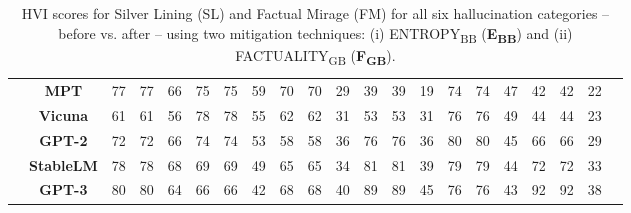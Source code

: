 \begin{table}[H]
{\begin{tabular}{lcccccccccccccccccccc}
&\textbf{MPT} &\cellcolor[HTML]{E6EEF7}77 &\cellcolor[HTML]{E6EEF7}77 &\cellcolor[HTML]{E6EEF7}66 &\cellcolor[HTML]{E6EEF7}75 &\cellcolor[HTML]{E6EEF7}75 &\cellcolor[HTML]{E6EEF7}59 &\cellcolor[HTML]{E6EEF7}70 &\cellcolor[HTML]{E6EEF7}70 &\cellcolor[HTML]{E6EEF7}29 &\cellcolor[HTML]{E6EEF7}39 &\cellcolor[HTML]{E6EEF7}39 &\cellcolor[HTML]{E6EEF7}19 &\cellcolor[HTML]{E6EEF7}74 &\cellcolor[HTML]{E6EEF7}74 &\cellcolor[HTML]{E6EEF7}47 &\cellcolor[HTML]{E6EEF7}42 &\cellcolor[HTML]{E6EEF7}42 &\cellcolor[HTML]{E6EEF7}22 \\
&\textbf{Vicuna} &\cellcolor[HTML]{E6EEF7}61 &\cellcolor[HTML]{E6EEF7}61 &\cellcolor[HTML]{E6EEF7}56 &\cellcolor[HTML]{E6EEF7}78 &\cellcolor[HTML]{E6EEF7}78 &\cellcolor[HTML]{E6EEF7}55 &\cellcolor[HTML]{E6EEF7}62 &\cellcolor[HTML]{E6EEF7}62 &\cellcolor[HTML]{E6EEF7}31 &\cellcolor[HTML]{E6EEF7}53 &\cellcolor[HTML]{E6EEF7}53 &\cellcolor[HTML]{E6EEF7}31 &\cellcolor[HTML]{E6EEF7}76 &\cellcolor[HTML]{E6EEF7}76 &\cellcolor[HTML]{E6EEF7}49 &\cellcolor[HTML]{E6EEF7}44 &\cellcolor[HTML]{E6EEF7}44 &\cellcolor[HTML]{E6EEF7}23 \\
&\textbf{GPT-2} &\cellcolor[HTML]{E6EEF7}72 &\cellcolor[HTML]{E6EEF7}72 &\cellcolor[HTML]{E6EEF7}66 &\cellcolor[HTML]{E6EEF7}74 &\cellcolor[HTML]{E6EEF7}74 &\cellcolor[HTML]{E6EEF7}53 &\cellcolor[HTML]{E6EEF7}58 &\cellcolor[HTML]{E6EEF7}58 &\cellcolor[HTML]{E6EEF7}36 &\cellcolor[HTML]{E6EEF7}76 &\cellcolor[HTML]{E6EEF7}76 &\cellcolor[HTML]{E6EEF7}36 &\cellcolor[HTML]{E6EEF7}80 &\cellcolor[HTML]{E6EEF7}80 &\cellcolor[HTML]{E6EEF7}45 &\cellcolor[HTML]{E6EEF7}66 &\cellcolor[HTML]{E6EEF7}66 &\cellcolor[HTML]{E6EEF7}29 \\
&\textbf{StableLM} &\cellcolor[HTML]{E6EEF7}78 &\cellcolor[HTML]{E6EEF7}78 &\cellcolor[HTML]{E6EEF7}68 &\cellcolor[HTML]{E6EEF7}69 &\cellcolor[HTML]{E6EEF7}69 &\cellcolor[HTML]{E6EEF7}49 &\cellcolor[HTML]{E6EEF7}65 &\cellcolor[HTML]{E6EEF7}65 &\cellcolor[HTML]{E6EEF7}34 &\cellcolor[HTML]{E6EEF7}81 &\cellcolor[HTML]{E6EEF7}81 &\cellcolor[HTML]{E6EEF7}39 &\cellcolor[HTML]{E6EEF7}79 &\cellcolor[HTML]{E6EEF7}79 &\cellcolor[HTML]{E6EEF7}44 &\cellcolor[HTML]{E6EEF7}72 &\cellcolor[HTML]{E6EEF7}72 &\cellcolor[HTML]{E6EEF7}33 \\
&\textbf{GPT-3} &\cellcolor[HTML]{E6EEF7}80 &\cellcolor[HTML]{E6EEF7}80 &\cellcolor[HTML]{E6EEF7}64 &\cellcolor[HTML]{E6EEF7}66 &\cellcolor[HTML]{E6EEF7}66 &\cellcolor[HTML]{E6EEF7}42 &\cellcolor[HTML]{E6EEF7}68 &\cellcolor[HTML]{E6EEF7}68 &\cellcolor[HTML]{E6EEF7}40 &\cellcolor[HTML]{E6EEF7}89 &\cellcolor[HTML]{E6EEF7}89 &\cellcolor[HTML]{E6EEF7}45 &\cellcolor[HTML]{E6EEF7}76 &\cellcolor[HTML]{E6EEF7}76 &\cellcolor[HTML]{E6EEF7}43 &\cellcolor[HTML]{E6EEF7}92 &\cellcolor[HTML]{E6EEF7}92 &\cellcolor[HTML]{E6EEF7}38 \\

\bottomrule
\end{tabular}%
}
\caption{HVI scores for Silver Lining (SL) and Factual Mirage (FM) for all six hallucination categories -- before vs. after -- using two mitigation techniques: (i) ENTROPY\textsubscript{BB} (\textbf{E\textsubscript{BB}}) and (ii) FACTUALITY\textsubscript{GB} (\textbf{F\textsubscript{GB}}).}
\label{tab:mitigation_values}
\end{table}

